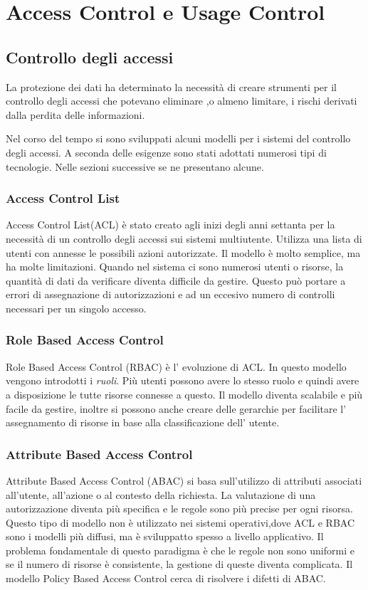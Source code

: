 \chapter{Access Control e Usage Control}
\label{chap:Access Control e Usage Control}
\section{Controllo degli accessi}
\label{sec:Controllo degli accessi}
La protezione dei dati ha determinato la necessità di creare strumenti per il controllo degli accessi che potevano eliminare
,o almeno limitare, i rischi derivati dalla perdita delle informazioni.\par
Nel corso del tempo si sono sviluppati alcuni modelli per i sistemi del controllo degli accessi. A seconda delle esigenze
sono stati adottati numerosi tipi di tecnologie\cite{NISTACM}. Nelle sezioni successive se ne presentano alcune.
\subsection{Access Control List}
\label{sub:ACL}
Access Control List(ACL) è stato creato agli inizi degli anni settanta per la necessità di un controllo degli
accessi sui sistemi multiutente.
Utilizza una lista di utenti con annesse le possibili azioni autorizzate. Il modello è molto semplice,
ma ha molte limitazioni. Quando nel sistema ci sono numerosi utenti o risorse, la quantità di dati da verificare diventa
difficile da gestire. Questo può portare a errori di assegnazione di autorizzazioni e ad un eccesivo numero di controlli
necessari per un singolo accesso.
\subsection{Role Based Access Control}
\label{sub:RBAC}
Role Based Access Control (RBAC) è l' evoluzione di ACL. In questo modello vengono introdotti i \emph{ruoli}. Più utenti
possono avere lo stesso ruolo e quindi avere a disposizione le tutte risorse connesse a questo. Il modello
diventa scalabile e più facile da gestire, inoltre si possono anche creare delle gerarchie per facilitare l' assegnamento di
risorse in base alla classificazione dell' utente.
\subsection{Attribute Based Access Control}
\label{sub:ABAC}
Attribute Based Access Control (ABAC) si basa sull'utilizzo di attributi associati all'utente, all'azione o al contesto
della richiesta. La valutazione di una autorizzazione diventa più specifica e le regole sono più precise per ogni risorsa.
Questo tipo di modello non è utilizzato nei sistemi operativi,dove ACL e RBAC sono i modelli più diffusi, ma è sviluppatto
spesso a livello applicativo. Il problema fondamentale di questo paradigma è che le regole non sono uniformi e se il numero
di risorse è consistente, la gestione di queste diventa complicata. Il modello Policy Based Access Control cerca di
risolvere i difetti di ABAC.
